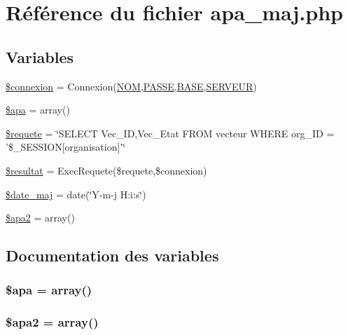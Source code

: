 \hypertarget{apa__maj_8php}{
\section{R\'{e}f\'{e}rence du fichier apa\_\-maj.php}
\label{apa__maj_8php}
}
\subsection*{Variables}
\begin{CompactItemize}
\item 
\hyperlink{apa__maj_8php_a0}{\$connexion} = Connexion(\hyperlink{pma__connect_8php_a0}{NOM},\hyperlink{pma__connect_8php_a1}{PASSE},\hyperlink{pma__connect_8php_a3}{BASE},\hyperlink{pma__connect_8php_a2}{SERVEUR})
\item 
\hyperlink{apa__maj_8php_a1}{\$apa} = array()
\item 
\hyperlink{apa__maj_8php_a2}{\$requete} = \char`\"{}SELECT Vec\_\-ID,Vec\_\-Etat FROM vecteur WHERE org\_\-ID = '\$\_\-SESSION\mbox{[}organisation\mbox{]}'\char`\"{}
\item 
\hyperlink{apa__maj_8php_a3}{\$resultat} = Exec\-Requete(\$requete,\$connexion)
\item 
\hyperlink{apa__maj_8php_a4}{\$date\_\-maj} = date(\char`\"{}Y-m-j H:i:s\char`\"{})
\item 
\hyperlink{apa__maj_8php_a5}{\$apa2} = array()
\end{CompactItemize}


\subsection{Documentation des variables}
\hypertarget{apa__maj_8php_a1}{
\subsubsection[\$apa]{\setlength{\rightskip}{0pt plus 5cm}\$apa = array()}}
\label{apa__maj_8php_a1}


\hypertarget{apa__maj_8php_a5}{
\subsubsection[\$apa2]{\setlength{\rightskip}{0pt plus 5cm}\$apa2 = array()}}
\label{apa__maj_8php_a5}


